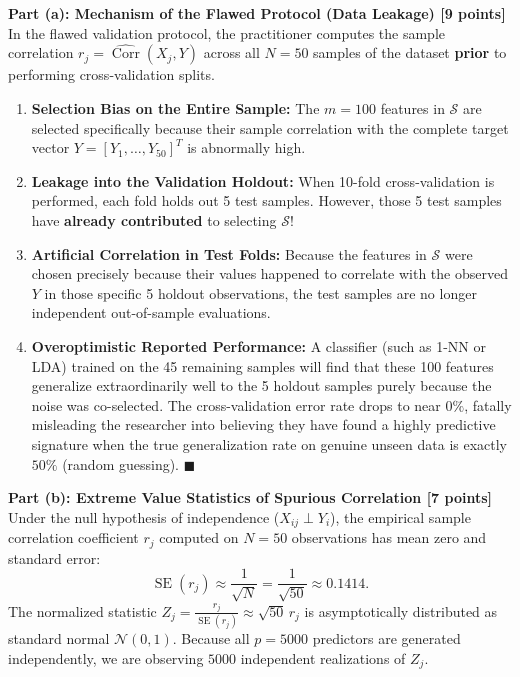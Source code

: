 \documentclass[11pt,a4paper]{article}
\begin{document}
\textbf{Part (a): Mechanism of the Flawed Protocol (Data Leakage) [9 points]} \\
In the flawed validation protocol, the practitioner computes the sample correlation $r_j = \widehat{\operatorname{Corr}}(X_j, Y)$ across all $N = 50$ samples of the dataset \textbf{prior} to performing cross-validation splits.
\begin{enumerate}[label=\arabic*., leftmargin=18pt, itemsep=3pt]
  \item \textbf{Selection Bias on the Entire Sample:} The $m = 100$ features in $\mathcal{S}$ are selected specifically because their sample correlation with the complete target vector $Y = [Y_1, \dots, Y_{50}]^T$ is abnormally high.
  \item \textbf{Leakage into the Validation Holdout:} When 10-fold cross-validation is performed, each fold holds out 5 test samples. However, those 5 test samples have \textbf{already contributed} to selecting $\mathcal{S}$!
  \item \textbf{Artificial Correlation in Test Folds:} Because the features in $\mathcal{S}$ were chosen precisely because their values happened to correlate with the observed $Y$ in those specific 5 holdout observations, the test samples are no longer independent out-of-sample evaluations.
  \item \textbf{Overoptimistic Reported Performance:} A classifier (such as 1-NN or LDA) trained on the 45 remaining samples will find that these 100 features generalize extraordinarily well to the 5 holdout samples purely because the noise was co-selected. The cross-validation error rate drops to near $0\%$, fatally misleading the researcher into believing they have found a highly predictive signature when the true generalization rate on genuine unseen data is exactly $50\%$ (random guessing). $\blacksquare$
\end{enumerate}

\vspace{4pt}
\textbf{Part (b): Extreme Value Statistics of Spurious Correlation [7 points]} \\
Under the null hypothesis of independence ($X_{ij} \perp Y_i$), the empirical sample correlation coefficient $r_j$ computed on $N = 50$ observations has mean zero and standard error:
\[
  \operatorname{SE}(r_j) \approx \frac{1}{\sqrt{N}} = \frac{1}{\sqrt{50}} \approx 0.1414.
\]
The normalized statistic $Z_j = \frac{r_j}{\operatorname{SE}(r_j)} \approx \sqrt{50} \, r_j$ is asymptotically distributed as standard normal $\mathcal{N}(0, 1)$.
Because all $p = 5000$ predictors are generated independently, we are observing $5000$ independent realizations of $Z_j$.
\end{document}
